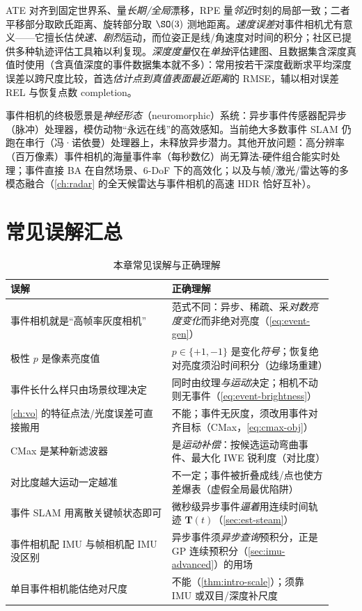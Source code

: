 \noindent ATE 对齐到固定世界系、量\emph{长期/全局}漂移，RPE 量\emph{邻近}时刻的局部一致；二者平移部分取欧氏距离、旋转部分取 $\SO(3)$ 测地距离。\emph{速度误差}对事件相机尤有意义——它擅长估\emph{快速、剧烈}运动，而位姿正是线/角速度对时间的积分；社区已提供多种轨迹评估工具箱以利复现\cite{carlone2026handbook}。\emph{深度度量}仅在\emph{单独}评估建图、且数据集含深度真值时使用（含真值深度的事件数据集本就不多）：常用按若干深度截断求平均深度误差以跨尺度比较，首选\emph{估计点到真值表面最近距离}的 RMSE，辅以相对误差 REL 与恢复点数 completion。

\begin{note}[前沿与开放问题]
事件相机的终极愿景是\emph{神经形态}（neuromorphic）系统：异步事件传感器配异步（脉冲）处理器，模仿动物“永远在线”的高效感知\cite{gallego2022eventsurvey}。当前绝大多数事件 SLAM 仍跑在串行（冯·诺依曼）处理器上，未释放异步潜力。其他开放问题：高分辨率（百万像素）事件相机的海量事件率（每秒数亿）尚无算法-硬件组合能实时处理；事件直接 BA 在自然场景、6-DoF 下的高效化；以及与帧/激光/雷达等的多模态融合（\cref{ch:radar} 的全天候雷达与事件相机的高速 HDR 恰好互补）。
\end{note}

\section*{常见误解汇总}

\begin{table}[H]\centering\small
\caption{本章常见误解与正确理解}
\begin{tabular}{p{0.46\linewidth}p{0.46\linewidth}}
\toprule
误解 & 正确理解 \\
\midrule
事件相机就是“高帧率灰度相机” & 范式不同：异步、稀疏、采\emph{对数亮度变化}而非绝对亮度（\cref{eq:event-gen}）\\
极性 $p$ 是像素亮度值 & $p\in\{+1,-1\}$ 是变化\emph{符号}；恢复绝对亮度须沿时间积分（边缘场重建）\\
事件长什么样只由场景纹理决定 & 同时由纹理\emph{与运动}决定；相机不动则无事件（\cref{eq:event-brightness}）\\
\cref{ch:vo} 的特征点法/光度误差可直接搬用 & 不能；事件无灰度，须改用事件对齐目标（CMax，\cref{eq:cmax-obj}）\\
CMax 是某种新滤波器 & 是\emph{运动补偿}：按候选运动弯曲事件、最大化 IWE 锐利度（对比度）\\
对比度越大运动一定越准 & 不一定；事件被折叠成线/点也使方差爆表（虚假全局最优陷阱）\\
事件 SLAM 用离散关键帧状态即可 & 微秒级异步事件\emph{逼着}用连续时间轨迹 $\mathbf T(t)$（\cref{sec:est-steam}）\\
事件相机配 IMU 与帧相机配 IMU 没区别 & 异步事件须\emph{异步查询}预积分，正是 GP 连续预积分（\cref{sec:imu-advanced}）的用场 \\
单目事件相机能估绝对尺度 & 不能（\cref{thm:intro-scale}）；须靠 IMU 或双目/深度补尺度 \\
\bottomrule
\end{tabular}
\end{table}

